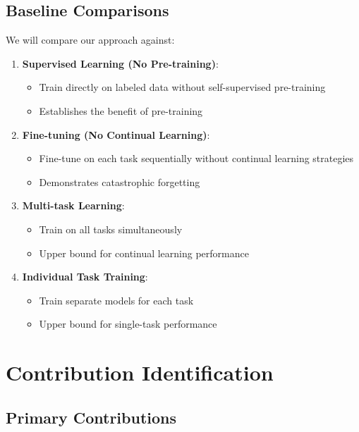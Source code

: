 \documentclass[conference]{IEEEtran}
\begin{document}
\subsection{Baseline Comparisons}

We will compare our approach against:

\begin{enumerate}
    \item \textbf{Supervised Learning (No Pre-training)}:
    \begin{itemize}
        \item Train directly on labeled data without self-supervised pre-training
        \item Establishes the benefit of pre-training
    \end{itemize}
    
    \item \textbf{Fine-tuning (No Continual Learning)}:
    \begin{itemize}
        \item Fine-tune on each task sequentially without continual learning strategies
        \item Demonstrates catastrophic forgetting
    \end{itemize}
    
    \item \textbf{Multi-task Learning}:
    \begin{itemize}
        \item Train on all tasks simultaneously
        \item Upper bound for continual learning performance
    \end{itemize}
    
    \item \textbf{Individual Task Training}:
    \begin{itemize}
        \item Train separate models for each task
        \item Upper bound for single-task performance
    \end{itemize}
\end{enumerate}

\section{Contribution Identification}

\subsection{Primary Contributions}
\end{document}
